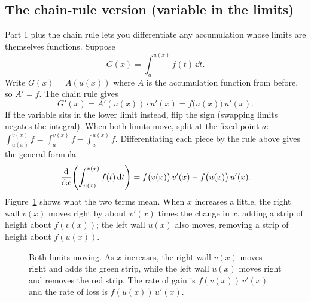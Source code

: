 \subsection{The chain-rule version (variable in the limits)}

Part 1 plus the chain rule lets you differentiate any accumulation whose limits
are themselves functions. Suppose
\[
  G(x) = \int_a^{u(x)} f(t)\,\dd t .
\]
Write $G(x)=A(u(x))$ where $A$ is the accumulation function from before, so
$A'=f$. The chain rule gives
\[
  G'(x) = A'(u(x))\cdot u'(x) = f\big(u(x)\big)\, u'(x).
\]
If the variable sits in the lower limit instead, flip the sign (swapping limits
negates the integral). When both limits move, split at the fixed point $a$:
$\int_{u(x)}^{v(x)} f = \int_a^{v(x)} f - \int_a^{u(x)} f$. Differentiating each
piece by the rule above gives the general formula
\[
  \frac{\mathrm{d}}{\mathrm{d} x}\!\left(\int_{u(x)}^{v(x)} f(t)\,\mathrm{d} t\right)
  = f\big(v(x)\big)\,v'(x) - f\big(u(x)\big)\,u'(x).
\]
Figure~\ref{ch21:fig-chain} shows what the two terms mean. When $x$ increases a
little, the right wall $v(x)$ moves right by about $v'(x)$ times the change in $x$,
adding a strip of height about $f(v(x))$; the left wall $u(x)$ also moves,
removing a strip of height about $f(u(x))$.

\begin{figure}[htbp]
\centering
{}
\caption{Both limits moving. As $x$ increases, the right wall $v(x)$ moves right and
adds the green strip, while the left wall $u(x)$ moves right and removes the red
strip. The rate of gain is $f(v(x))\,v'(x)$ and the rate of loss is
$f(u(x))\,u'(x)$.}
\label{ch21:fig-chain}
\end{figure}

